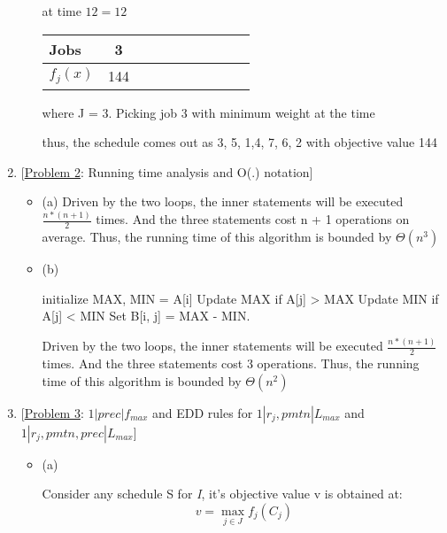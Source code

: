 \documentclass[12pt]{article}
\begin{document}
\begin{enumerate}
\begin{itemize}
at time $12 = 12$
\begin{center}
\begin{tabular}{l*{8}{c}r}
Jobs          & 3                                \\
\hline
$f_{j}(x)$    & 144                              \\
\end{tabular}
\end{center}
where J = 3. Picking job 3 with minimum weight at the time

thus, the schedule comes out as 3, 5, 1,4, 7, 6, 2 with objective value 144

\end{itemize}


\medskip

\item{} [\underline{Problem 2}: Running time analysis  and O(.) notation]

\begin{itemize}
\item{(a)}
Driven by the two loops, the inner statements will be executed $\frac{n * (n + 1)}{2}$ times. And the three statements cost n + 1 operations on average. Thus, the running time of this algorithm is bounded by $\Theta(n^{3})$

\item{(b)}
\begin{algorithmic}
    \State initialize MAX, MIN = A[i]
        \State Update MAX if A[j] > MAX
        \State Update MIN if A[j] < MIN
        \State Set B[i, j] = MAX - MIN.
    \EndFor
\EndFor
\end{algorithmic}
Driven by the two loops, the inner statements will be executed $\frac{n * (n + 1)}{2}$ times. And the three statements cost 3 operations. Thus, the running time of this algorithm is bounded by $\Theta(n^{2})$


\end{itemize}

\medskip

\item{} [\underline{Problem 3}: $1|prec|f_{max}$ and EDD rules for $1|r_{j}, pmtn|L_{max}$ and $1|r_{j}, pmtn, prec|L_{max}$]

\begin{itemize}
\item{(a)}

Consider any schedule S for {\it I}, it's objective value v is obtained at:
\begin{equation}
v = \max\limits_{j \in J} {f_{j}(C_{j})}
\end{equation}


\end{itemize}
\end{enumerate}
\end{document}
